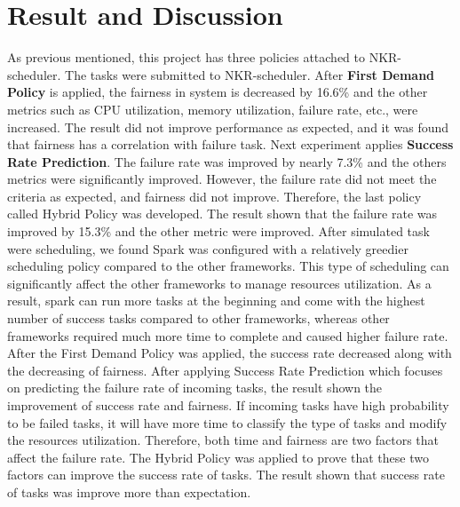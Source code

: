 \documentclass[12pt,oneside,openright,a4paper]{cpe-english-project}
\begin{document}
\section{Result and Discussion}
\hspace{10mm}As previous mentioned, this project has three policies attached to NKR-scheduler. The tasks were submitted to NKR-scheduler. After \textbf{First Demand Policy} is applied, the fairness in system is decreased by 16.6\% and the other metrics such as CPU utilization, memory utilization, failure rate, etc., were increased. The result did not improve performance as expected, and it was found that fairness has a correlation with failure task. Next experiment applies \textbf{Success Rate Prediction}. The failure rate was improved by nearly 7.3\% and the others metrics were significantly improved. However, the failure rate did not meet the criteria as expected, and fairness did not improve. Therefore, the last policy called Hybrid Policy was developed. The result shown that the failure rate was improved by 15.3\% and the other metric were improved. After simulated task were scheduling, we found Spark was configured with a relatively greedier scheduling policy compared to the other frameworks. This type of scheduling can significantly affect the other frameworks to manage resources utilization. As a result, spark can run more tasks at the beginning and come with the highest number of success tasks compared to other frameworks, whereas other frameworks required much more time to complete and caused higher failure rate. After the First Demand Policy was applied, the success rate decreased along with the decreasing of fairness. After applying Success Rate Prediction which focuses on predicting the failure rate of incoming tasks, the result shown the improvement of success rate and fairness. If incoming tasks have high probability to be failed tasks, it will have more time to classify the type of tasks and modify the resources utilization. Therefore, both time and fairness are two factors that affect the failure rate. The Hybrid Policy was applied to prove that these two factors can improve the success rate of tasks. The result shown that success rate of tasks was improve more than expectation.

\end{document}

